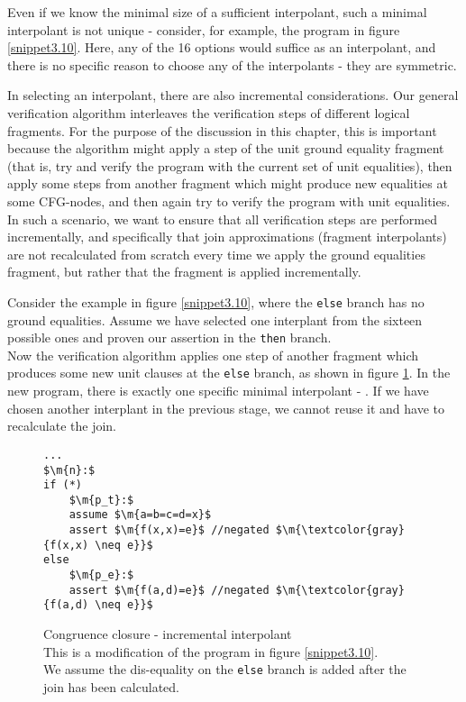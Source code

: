 Even if we know the minimal size of a sufficient interpolant, such a minimal interpolant is not unique - consider, for example, the program in figure \ref{snippet3.10}.
Here, any of the 16 options  would suffice as an interpolant, 
and there is no specific reason to choose any of the interpolants - they are symmetric.

In selecting an interpolant, there are also incremental considerations. 
Our general verification algorithm interleaves the verification steps of different logical fragments.
For the purpose of the discussion in this chapter, this is important because the algorithm might apply a step of the unit ground equality fragment (that is, try and verify the program with the current set of unit equalities), then apply some steps from another fragment which might produce new equalities at some CFG-nodes, and then again try to verify the program with unit equalities. In such a scenario, we want to ensure that all verification steps are performed incrementally, and specifically that join approximations (fragment interpolants) are not recalculated from scratch every time we apply the ground equalities fragment, but rather that the fragment is applied incrementally.

Consider the example in figure \ref{snippet3.10}, where the \lstinline|else| branch has no ground equalities.
Assume we have selected one interplant from the sixteen possible ones and proven our assertion in the \lstinline|then| branch.\\
Now the verification algorithm applies one step of another fragment which produces some new unit clauses at the \lstinline|else| branch, as shown in figure \ref{snippet3.10a}. In the new program, there is exactly one specific minimal interpolant - .
If we have chosen another interplant in the previous stage, we cannot reuse it and have to recalculate the join.

\begin{figure}
\begin{lstlisting}
...
$\m{n}:$
if (*)
	$\m{p_t}:$
	assume $\m{a=b=c=d=x}$
	assert $\m{f(x,x)=e}$ //negated $\m{\textcolor{gray}{f(x,x) \neq e}}$
else
	$\m{p_e}:$
	assert $\m{f(a,d)=e}$ //negated $\m{\textcolor{gray}{f(a,d) \neq e}}$
\end{lstlisting}
\caption{Congruence closure - incremental interpolant\\
This is a modification of the program in figure \ref{snippet3.10}.\\
We assume the dis-equality on the \lstinline|else| branch is added after the join has been calculated.
}
\label{snippet3.10a}
\end{figure}
\noindent

